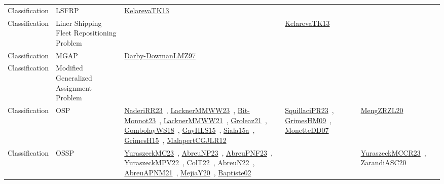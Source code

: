 {\begin{longtable}{lp{3cm}>{\raggedright\arraybackslash}p{6cm}>{\raggedright\arraybackslash}p{6cm}>{\raggedright\arraybackslash}p{8cm}}
Classification & LSFRP & \href{works/KelarevaTK13.pdf}{KelarevaTK13}~\cite{KelarevaTK13} &  & \\
Classification & Liner Shipping Fleet Repositioning Problem &  & \href{works/KelarevaTK13.pdf}{KelarevaTK13}~\cite{KelarevaTK13} & \\
Classification & MGAP & \href{works/Darby-DowmanLMZ97.pdf}{Darby-DowmanLMZ97}~\cite{Darby-DowmanLMZ97} &  & \\
Classification & Modified Generalized Assignment Problem &  &  & \\
Classification & OSP & \href{works/NaderiRR23.pdf}{NaderiRR23}~\cite{NaderiRR23}, \href{works/LacknerMMWW23.pdf}{LacknerMMWW23}~\cite{LacknerMMWW23}, \href{works/Bit-Monnot23.pdf}{Bit-Monnot23}~\cite{Bit-Monnot23}, \href{works/LacknerMMWW21.pdf}{LacknerMMWW21}~\cite{LacknerMMWW21}, \href{works/Groleaz21.pdf}{Groleaz21}~\cite{Groleaz21}, \href{works/GombolayWS18.pdf}{GombolayWS18}~\cite{GombolayWS18}, \href{works/GayHLS15.pdf}{GayHLS15}~\cite{GayHLS15}, \href{works/Siala15a.pdf}{Siala15a}~\cite{Siala15a}, \href{works/GrimesH15.pdf}{GrimesH15}~\cite{GrimesH15}, \href{works/MalapertCGJLR12.pdf}{MalapertCGJLR12}~\cite{MalapertCGJLR12} & \href{works/SquillaciPR23.pdf}{SquillaciPR23}~\cite{SquillaciPR23}, \href{works/GrimesHM09.pdf}{GrimesHM09}~\cite{GrimesHM09}, \href{works/MonetteDD07.pdf}{MonetteDD07}~\cite{MonetteDD07} & \href{works/MengZRZL20.pdf}{MengZRZL20}~\cite{MengZRZL20}\\
Classification & OSSP & \href{works/YuraszeckMC23.pdf}{YuraszeckMC23}~\cite{YuraszeckMC23}, \href{works/AbreuNP23.pdf}{AbreuNP23}~\cite{AbreuNP23}, \href{works/AbreuPNF23.pdf}{AbreuPNF23}~\cite{AbreuPNF23}, \href{works/YuraszeckMPV22.pdf}{YuraszeckMPV22}~\cite{YuraszeckMPV22}, \href{works/ColT22.pdf}{ColT22}~\cite{ColT22}, \href{works/AbreuN22.pdf}{AbreuN22}~\cite{AbreuN22}, \href{works/AbreuAPNM21.pdf}{AbreuAPNM21}~\cite{AbreuAPNM21}, \href{works/MejiaY20.pdf}{MejiaY20}~\cite{MejiaY20}, \href{works/Baptiste02.pdf}{Baptiste02}~\cite{Baptiste02} &  & \href{works/YuraszeckMCCR23.pdf}{YuraszeckMCCR23}~\cite{YuraszeckMCCR23}, \href{works/ZarandiASC20.pdf}{ZarandiASC20}~\cite{ZarandiASC20}\\

\end{longtable}}
